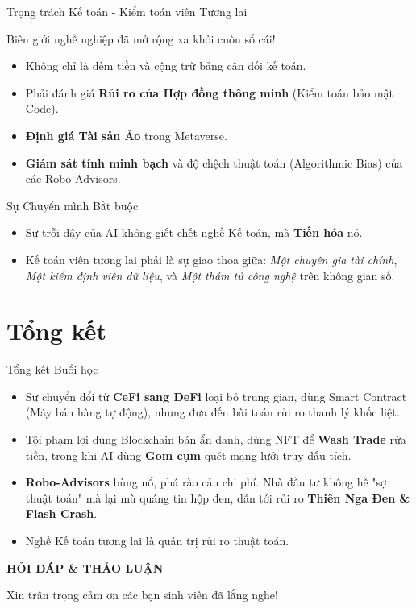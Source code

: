 \documentclass[aspectratio=169, 12pt]{beamer}
\begin{document}
\begin{frame}{Trọng trách Kế toán - Kiểm toán viên Tương lai}
    \begin{block}{Biên giới nghề nghiệp đã mở rộng xa khỏi cuốn sổ cái!}
        \begin{itemize}
            \item Không chỉ là đếm tiền và cộng trừ bảng cân đối kế toán.
            \item Phải đánh giá \textbf{Rủi ro của Hợp đồng thông minh} (Kiểm toán bảo mật Code).
            \item \textbf{Định giá Tài sản Ảo} trong Metaverse.
            \item \textbf{Giám sát tính minh bạch} và độ chệch thuật toán (Algorithmic Bias) của các Robo-Advisors.
        \end{itemize}
    \end{block}
\end{frame}

\begin{frame}{Sự Chuyển mình Bắt buộc}
    \begin{itemize}
        \item Sự trỗi dậy của AI không giết chết nghề Kế toán, mà \textbf{Tiến hóa} nó.
        \item Kế toán viên tương lai phải là sự giao thoa giữa: \textit{Một chuyên gia tài chính}, \textit{Một kiểm định viên dữ liệu}, và \textit{Một thám tử công nghệ} trên không gian số.
    \end{itemize}
\end{frame}

\section{Tổng kết}

\begin{frame}{Tổng kết Buổi học}
    \begin{itemize}
        \item Sự chuyển đổi từ \textbf{CeFi sang DeFi} loại bỏ trung gian, dùng Smart Contract (Máy bán hàng tự động), nhưng đưa đến bài toán rủi ro thanh lý khốc liệt.
        \item Tội phạm lợi dụng Blockchain bán ẩn danh, dùng NFT để \textbf{Wash Trade} rửa tiền, trong khi AI dùng \textbf{Gom cụm} quét mạng lưới truy dấu tích.
        \item \textbf{Robo-Advisors} bùng nổ, phá rào cản chi phí. Nhà đầu tư không hề "sợ thuật toán" mà lại mù quáng tin hộp đen, dẫn tới rủi ro \textbf{Thiên Nga Đen \& Flash Crash}.
        \item Nghề Kế toán tương lai là quản trị rủi ro thuật toán.
    \end{itemize}
\end{frame}

\begin{frame}
    \begin{center}
        \Huge \textbf{HỎI ĐÁP \& THẢO LUẬN}
        
        \vspace{1cm}
        \large Xin trân trọng cảm ơn các bạn sinh viên đã lắng nghe!
    \end{center}
\end{frame}
\end{document}
